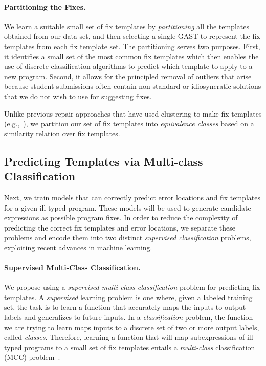 \paragraph{Partitioning the Fixes.} We learn a suitable small set of fix
templates by \emph{partitioning} all the templates obtained from our data set,
and then selecting a single GAST to represent the fix templates from each fix
template set.
%
The partitioning serves two purposes.
%
First, it identifies a small set of the most common fix templates which then
enables the use of discrete classification algorithms to predict which template
to apply to a new program.
%
Second, it allows for the principled removal of outliers that arise because
student submissions often contain non-standard or idiosyncratic solutions that
we do not wish to use for suggesting fixes.

Unlike previous repair approaches that have used clustering to make fix
templates (e.g.,~\cite{FIXME}), we partition our set of fix templates into
\emph{equivalence classes} based on a similarity relation over fix templates.


\subsection{Predicting Templates via Multi-class Classification}
\label{sec:overview:predict}

Next, we train models that can correctly predict error locations and fix
templates for a given ill-typed program. These models will be used to generate
candidate expressions as possible program fixes. In order to reduce the
complexity of predicting the correct fix templates and error locations, we
separate these problems and encode them into two distinct \emph{supervised
classification} problems, exploiting recent advances in machine learning.

\paragraph{Supervised Multi-Class Classification.}
We propose using a \emph{supervised multi-class classification} problem for
predicting fix templates. A \emph{supervised} learning problem is one
where,
given a labeled training set, the task is to learn a function that accurately
maps the inputs to output labels and generalizes to future inputs. In a
\emph{classification} problem, the function we are trying to learn maps inputs
to a discrete set of two or more output labels, called \emph{classes}.
Therefore, learning a function that will map subexpressions of ill-typed
programs to a small set of fix templates entails a \emph{multi-class}
classification (MCC) problem~\cite{FIXME}.

